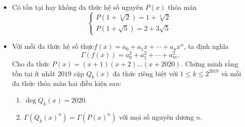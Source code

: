 \documentclass[11pt]{scrartcl}
\begin{document}
\begin{itemize}[label=, leftmargin=0em, itemsep=0.5em]
        \item \begin{btvn}
            Có tồn tại hay không đa thức hệ số nguyên $P(x)$ thỏa mãn\[ \begin{cases} P(1+\sqrt[3]{2})=1+\sqrt[3]{2}\\ P(1+\sqrt{5})=2+3\sqrt{5}\end{cases} \]
        \end{btvn}
        \item \begin{btvn}
            Với mỗi đa thức hệ số thực$f(x)={{a}_{0}}+{{a}_{1}}x+\cdots +{{a}_{n}}{{x}^{n}}$, ta định nghĩa 
            $$\Gamma (f(x))=a_{0}^{2}+a_{1}^{2}+\cdots +a_{m}^{2}.$$
            Cho đa thức $P(x)=(x+1)(x+2)\ldots (x+2020).$ Chứng minh rằng tồn tại ít nhất $2019$ cặp ${{Q}_{k}}(x)$ đa thức riêng biệt với $1\le k\le {{2}^{2019}}$ và mỗi đa thức thỏa mãn hai điều kiện sau:
            \begin{enumerate}
                \item $\deg {{Q}_{k}}(x)=2020.$
                \item $\Gamma \left( {{Q}_{k}}{{(x)}^{n}} \right)=\Gamma \left( P{{(x)}^{n}} \right)$ với mọi số nguyên dương $n$.
            \end{enumerate}

        \end{btvn}
        

\end{itemize}
\end{document}
